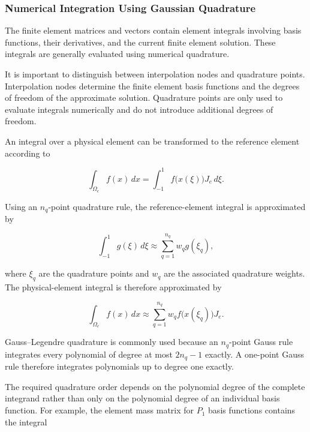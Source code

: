 \subsubsection{Numerical Integration Using Gaussian Quadrature}

The finite element matrices and vectors contain element integrals involving basis functions, their derivatives, and the current finite element solution. These integrals are generally evaluated using numerical quadrature.

It is important to distinguish between interpolation nodes and quadrature points. Interpolation nodes determine the finite element basis functions and the degrees of freedom of the approximate solution. Quadrature points are only used to evaluate integrals numerically and do not introduce additional degrees of freedom.

An integral over a physical element can be transformed to the reference element according to

\begin{equation}
    \int_{\Omega_e}f(x)\,dx
    =
    \int_{-1}^{1}f\bigl(x(\xi)\bigr)J_e\,d\xi.
\end{equation}

Using an $n_q$-point quadrature rule, the reference-element integral is approximated by

\begin{equation}
    \int_{-1}^{1}g(\xi)\,d\xi
    \approx
    \sum_{q=1}^{n_q}w_q g(\xi_q),
\end{equation}

where $\xi_q$ are the quadrature points and $w_q$ are the associated quadrature weights. The physical-element integral is therefore approximated by

\begin{equation}
    \int_{\Omega_e}f(x)\,dx
    \approx
    \sum_{q=1}^{n_q}
    w_q
    f\bigl(x(\xi_q)\bigr)
    J_e.
\end{equation}

Gauss--Legendre quadrature is commonly used because an $n_q$-point Gauss rule integrates every polynomial of degree at most $2n_q-1$ exactly.
A one-point Gauss rule therefore integrates polynomials up to degree one exactly. 

The required quadrature order depends on the polynomial degree of the complete integrand rather than only on the polynomial degree of an individual basis function. For example, the element mass matrix for $P_1$ basis functions contains the integral

